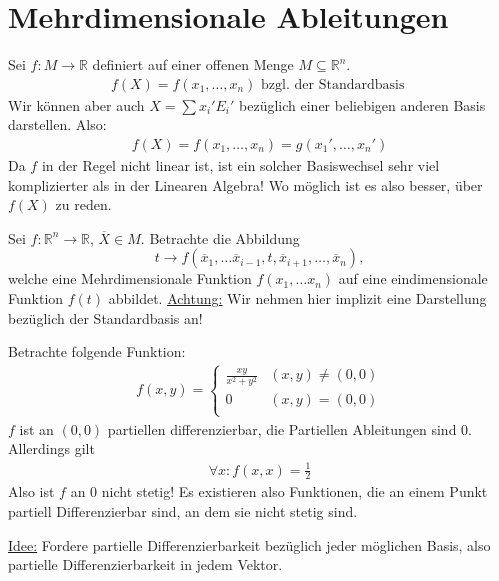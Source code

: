 \documentclass{report}
\newcommand{\ul}[1]{\underline{#1}}
\newcommand{\bR}{\mathbb{R}}
\begin{document}
\section{Mehrdimensionale Ableitungen}
\begin{beispiel}
 Sei $f : M \to \bR$ definiert auf einer offenen Menge $M \subseteq \bR^n$.
 \begin{align*}
  f(X) = f(x_1, \hdots, x_n) \text{ bzgl. der Standardbasis }
 \end{align*}
 Wir können aber auch $X = \sum x_i' E_i'$ bezüglich einer beliebigen anderen Basis darstellen. Also:
 \begin{align*}
  f(X) = f(x_1, \hdots, x_n) = g(x_1', \hdots, x_n')
 \end{align*}
 Da $f$ in der Regel nicht linear ist, ist ein solcher Basiswechsel sehr viel komplizierter als in der Linearen Algebra! Wo möglich ist es also besser, über $f(X)$ zu reden.
\end{beispiel}
\begin{definition}
 Sei $f : \bR^n \to \bR$, $\overline{X} \in M$. Betrachte die Abbildung \[t \to f(\overline{x}_1, \hdots \overline{x}_{i-1}, t, \overline{x}_{i+1}, \hdots, \overline{x}_n),\] welche eine Mehrdimensionale Funktion $f(x_1, \hdots x_n)$ auf eine eindimensionale Funktion $f(t)$ abbildet. \ul{Achtung:} Wir nehmen hier implizit eine Darstellung bezüglich der Standardbasis an!
\end{definition}
\begin{beispiel}
 Betrachte folgende Funktion:
 \begin{align*}
  f(x,y) = \begin{cases}
            \frac{xy}{x^2 + y^2} & (x,y) \neq (0,0)\\
            0 & (x,y) = (0,0)\\
           \end{cases}
 \end{align*}
 $f$ ist an $(0,0)$ partiellen differenzierbar, die Partiellen Ableitungen sind $0$. Allerdings gilt \begin{align*}
  \forall x : f(x,x) = \frac{1}{2}
 \end{align*}
 Also ist $f$ an $0$ nicht stetig! Es existieren also Funktionen, die an einem Punkt partiell Differenzierbar sind, an dem sie nicht stetig sind.
\end{beispiel}
\ul{Idee:} Fordere partielle Differenzierbarkeit bezüglich jeder möglichen Basis, also partielle Differenzierbarkeit in jedem Vektor.
\end{document}

